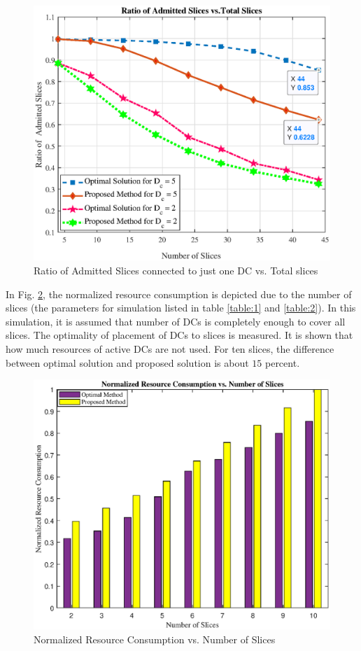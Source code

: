 \documentclass[conference]{IEEEtran}
\begin{document}
\begin{figure}[H]
  \centering
    \includegraphics[width=\linewidth]{f111}
  \caption{Ratio of Admitted Slices connected to just one DC vs. Total slices}
  \label{fig:f1}
\end{figure} 
In Fig. \ref{fig:f2}, the normalized resource consumption is depicted due to the number of slices (the parameters for simulation listed in table \ref{table:1} and \ref{table:2}). In this simulation, it is assumed that number of DCs is completely enough to cover all slices. The optimality of placement of DCs to slices is measured. It is shown that how much resources of active DCs are not used. For ten slices, the difference between optimal solution and proposed solution is about $15$ percent. 
\begin{figure}[H]
  \centering
    \includegraphics[width=\linewidth]{fig2_last}
  \caption{Normalized Resource Consumption vs. Number of Slices}
  \label{fig:f2}
\end{figure} 


\end{document}
